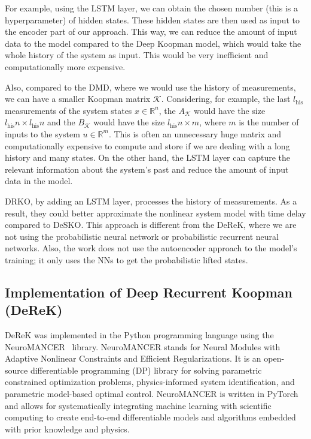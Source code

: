 \documentclass[conference]{IEEEtran}
\newcommand{\ui}[2]{#1_{\text{#2}}}
\begin{document}
For example, using the LSTM layer, we can obtain the chosen number (this is a hyperparameter) of hidden states. These hidden states are then used as input to the encoder part of our approach. This way, we can reduce the amount of input data to the model compared to the Deep Koopman model, which would take the whole history of the system as input. This would be very inefficient and computationally more expensive.

Also, compared to the DMD, where we would use the history of measurements, we can have a smaller Koopman matrix $\mathcal{K}$. Considering, for example, the last $\ui{l}{his}$ measurements of the system states $x \in \mathbb{R}^n$, the $A_\mathcal{K}$ would have the size $\ui{l}{his}n \times \ui{l}{his}n$ and the $B_\mathcal{K}$ would have the size $\ui{l}{his}n \times m$,  where $m$ is the number of inputs to the system $u \in \mathbb{R}^m$. This is often an unnecessary huge matrix and computationally expensive to compute and store if we are dealing with a long history and many states. On the other hand, the LSTM layer can capture the relevant information about the system's past and reduce the amount of input data in the model.

DRKO, by adding an LSTM layer, processes the history of measurements. As a result, they could better approximate the nonlinear system model with time delay compared to DeSKO. This approach is different from the DeReK, where we are not using the probabilistic neural network or probabilistic recurrent neural networks. Also, the work does not use the autoencoder approach to the model's training; it only uses the NNs to get the probabilistic lifted states.

\subsection{Implementation of Deep Recurrent Koopman (DeReK)}
DeReK was implemented in the Python programming language using the NeuroMANCER~\cite{Neuromancer2023} library. NeuroMANCER stands for Neural Modules with Adaptive Nonlinear Constraints and Efficient Regularizations. It is an open-source differentiable programming (DP) library for solving parametric constrained optimization problems, physics-informed system identification, and parametric model-based optimal control. NeuroMANCER is written in PyTorch and allows for systematically integrating machine learning with scientific computing to create end-to-end differentiable models and algorithms embedded with prior knowledge and physics.
\end{document}
